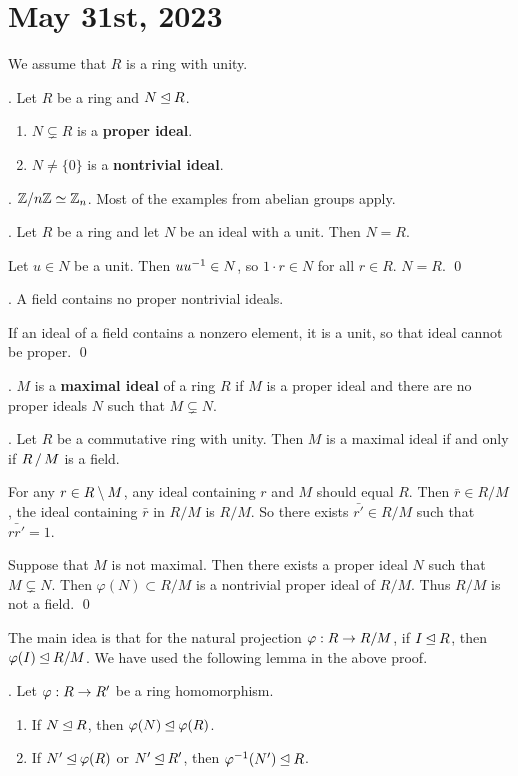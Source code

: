 \section*{May 31st, 2023}


We assume that \(R\) is a ring with unity.

. Let \(R\) be a ring and \(N \unlhd R\).
\begin{enumerate}
    \item \(N \subsetneq R\) is a \textbf{proper ideal}.
    \item \(N \neq \{0\}\) is a \textbf{nontrivial ideal}.
\end{enumerate}

\ex. \(\mathbb{Z} / n\mathbb{Z} \simeq \mathbb{Z}_n\). Most of the examples from abelian groups apply.

\thm. Let \(R\) be a ring and let \(N\) be an ideal with a unit. Then \(N = R\).

\pf Let \(u \in N\) be a unit. Then \(u u^{-1} \in N\), so \(1\cdot r \in N\) for all \(r \in R\). \(N = R\). \qed

\cor. A field contains no proper nontrivial ideals.

\pf If an ideal of a field contains a nonzero element, it is a unit, so that ideal cannot be proper. \qed

.  \(M\) is a \textbf{maximal ideal} of a ring \(R\) if \(M\) is a proper ideal and there are no proper ideals \(N\) such that \(M \subsetneq N\).

\thm. Let \(R\) be a commutative ring with unity. Then \(M\) is a maximal ideal if and only if \(R\operatorname{/} M\) is a field.

\pf \note{\mimp} For any \(r \in R \setminus M\), any ideal containing \(r\) and \(M\) should equal \(R\). Then \(\bar{r} \in R/M\), the ideal containing \(\bar{r}\) in \(R/M\) is \(R/M\). So there exists \(\bar{r'} \in R/M\) such that \(\bar{rr'} = 1\).

\note{\mimpd} Suppose that \(M\) is not maximal. Then there exists a proper ideal \(N\) such that \(M \subsetneq N\). Then \(\varphi(N) \subset R/M\) is a nontrivial proper ideal of \(R/M\). Thus \(R/M\) is not a field. \qed

The main idea is that for the natural projection \(\varphi: R \rightarrow R/M\), if \(I \unlhd R\), then \(\varphi(I) \unlhd R/M\). We have used the following lemma in the above proof.

\lemma. Let \(\varphi : R \rightarrow R'\) be a ring homomorphism.
\begin{enumerate}
    \item If \(N \unlhd R\), then \(\varphi(N) \unlhd \varphi(R)\).
    \item If \(N' \unlhd \varphi(R)\) or \(N' \unlhd R'\), then \(\varphi^{-1}(N') \unlhd R\).
\end{enumerate}

